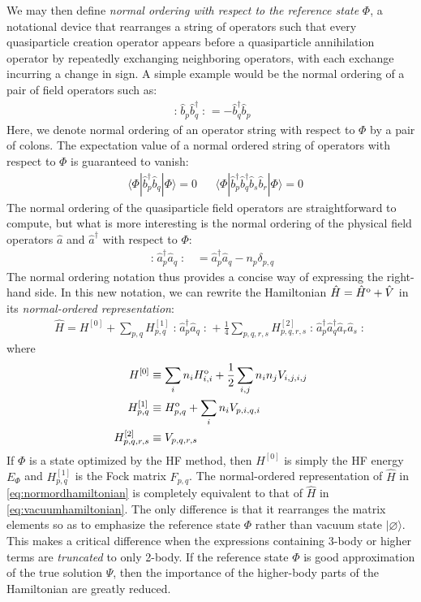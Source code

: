 \documentclass[amsmath, amssymb, aps, floatfix, nofootinbib, preprintnumbers,showpacs, superscriptaddress, twocolumn]{revtex4-1}
\newcommand{\ket}[1]{| #1 \rangle}
\newcommand{\bra}[1]{\langle #1 |}
\newcommand{\normord}[1]{\mathopen: #1 \mathclose:}
\begin{document}
We may then define \emph{normal ordering with respect to the reference state} $\Phi$, a notational device that rearranges a string of operators such that every quasiparticle creation operator appears before a quasiparticle annihilation operator by repeatedly exchanging neighboring operators, with each exchange incurring a change in sign.  A simple example would be the normal ordering of a pair of field operators such as:
\begin{align*}
  \normord{\hat{b}_p \hat{b}_q^\dagger} =
  -\hat{b}_q^\dagger \hat{b}_p
\end{align*}
Here, we denote normal ordering of an operator string with respect to $\Phi$ by a pair of colons.  The expectation value of a normal ordered string of operators with respect to $\Phi$ is guaranteed to vanish:
\begin{align*}
&\bra{\Phi} \hat{b}_p^\dagger \hat{b}_q \ket{\Phi} = 0 &
&\bra{\Phi} \hat{b}_p^\dagger \hat{b}_q^\dagger \hat{b}_s \hat{b}_r \ket{\Phi} = 0
\end{align*}
The normal ordering of the quasiparticle field operators are straightforward to compute, but what is more interesting is the normal ordering of the physical field operators $\hat a$ and $\hat a^\dagger$ with respect to $\Phi$:
\begin{align*}
  \normord{\hat{a}_p^\dagger \hat{a}_q} &=
  \hat{a}_p^\dagger \hat{a}_q - n_p \delta_{p, q}
\end{align*}
The normal ordering notation thus provides a concise way of expressing the right-hand side.  In this new notation, we can rewrite the Hamiltonian $\hat H = \hat H^{\text o} + \hat V$ in its \emph{normal-ordered representation}:
\begin{align}
  \hat{H} = H^{[0]} + \sum_{p, q} H^{[1]}_{p, q} \normord{\hat{a}_p^\dagger \hat{a}_q} + \frac{1}{4} \sum_{p, q, r, s} H^{[2]}_{p, q, r, s} \normord{\hat{a}_p^\dagger \hat{a}_q^\dagger \hat{a}_r \hat{a}_s}
  \label{eq:normordhamiltonian}
\end{align}
where
\begin{align*}
  H^{[0]} &\equiv \sum_{i} n_i H^{\text o}_{i, i} + \frac{1}{2} \sum_{i, j} n_i n_j V_{i, j, i, j} \\
  H^{[1]}_{p, q} &\equiv H^{\text o}_{p, q} + \sum_{i} n_i V_{p, i, q, i} \\
  H^{[2]}_{p, q, r, s} &\equiv V_{p, q, r, s} \\
\end{align*}
If $\Phi$ is a state optimized by the HF method, then $H^{[0]}$ is simply the HF energy $E_\Phi$ and $H^{[1]}_{p, q}$ is the Fock matrix $F_{p, q}$.  The normal-ordered representation of $\hat H$ in \eqref{eq:normordhamiltonian} is completely equivalent to that of $\hat H$ in \eqref{eq:vacuumhamiltonian}.  The only difference is that it rearranges the matrix elements so as to emphasize the reference state $\Phi$ rather than vacuum state $\ket{\varnothing}$.  This makes a critical difference when the expressions containing 3-body or higher terms are \emph{truncated} to only 2-body.  If the reference state $\Phi$ is good approximation of the true solution $\Psi$, then the importance of the higher-body parts of the Hamiltonian are greatly reduced.
\end{document}
